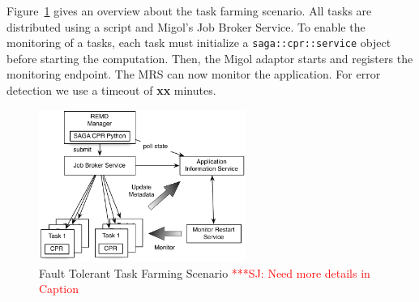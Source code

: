 \documentclass[times, 10pt,twocolumn]{article}
\newcommand{\jhanote}[1]{ {\textcolor{red} { ***SJ: #1 }}}
\begin{document}
        
Figure~\ref{fig:saga-taskfarming} gives an overview about the task farming scenario. All tasks are
distributed using a script and Migol's Job Broker Service.
To enable the monitoring of a tasks, each task must initialize a \texttt{saga::cpr::service} object 
before starting the computation.  Then, the Migol adaptor starts and registers the monitoring endpoint. 
The MRS can now monitor the application.  For error detection we use a timeout of \textbf{xx} minutes.
\begin{figure}[t]
    \centering
        \includegraphics[width=0.6\textwidth]{saga-taskfarming}
    \caption{Fault Tolerant Task Farming Scenario \jhanote{Need more details in Caption} }
    \label{fig:saga-taskfarming}
\end{figure} 
\end{document}
